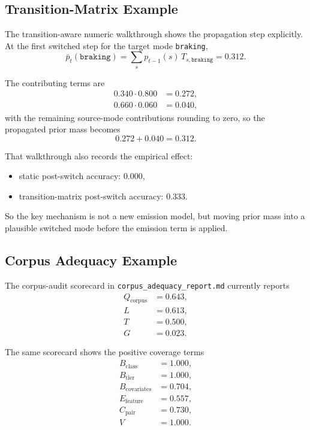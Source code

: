 \documentclass[11pt]{article}
\begin{document}
\subsection{Transition-Matrix Example}
The transition-aware numeric walkthrough
shows the propagation step explicitly. At the first switched step for the target
mode \texttt{braking},
\begin{equation}
\bar{p}_t(\texttt{braking})
= \sum_s p_{t-1}(s)\,T_{s,\texttt{braking}}
= 0.312.
\end{equation}

The contributing terms are
\begin{align}
0.340 \cdot 0.800 &= 0.272, \\
0.660 \cdot 0.060 &= 0.040,
\end{align}
with the remaining source-mode contributions rounding to zero, so the propagated prior mass becomes
\begin{equation}
0.272 + 0.040 = 0.312.
\end{equation}

That walkthrough also records the empirical effect:
\begin{itemize}[leftmargin=1.5em]
  \item static post-switch accuracy: \(0.000\),
  \item transition-matrix post-switch accuracy: \(0.333\).
\end{itemize}
So the key mechanism is not a new emission model, but moving prior mass into a plausible switched mode before the emission term is applied.

\subsection{Corpus Adequacy Example}
The corpus-audit scorecard in
\texttt{corpus\_adequacy\_report.md}
currently reports
\begin{align}
Q_{\text{corpus}} &= 0.643, \\
L &= 0.613, \\
T &= 0.500, \\
G &= 0.023.
\end{align}

The same scorecard shows the positive coverage terms
\begin{align}
B_{\text{class}} &= 1.000, \\
B_{\text{tier}} &= 1.000, \\
B_{\text{covariates}} &= 0.704, \\
E_{\text{feature}} &= 0.557, \\
C_{\text{pair}} &= 0.730, \\
V &= 1.000.
\end{align}
\end{document}
